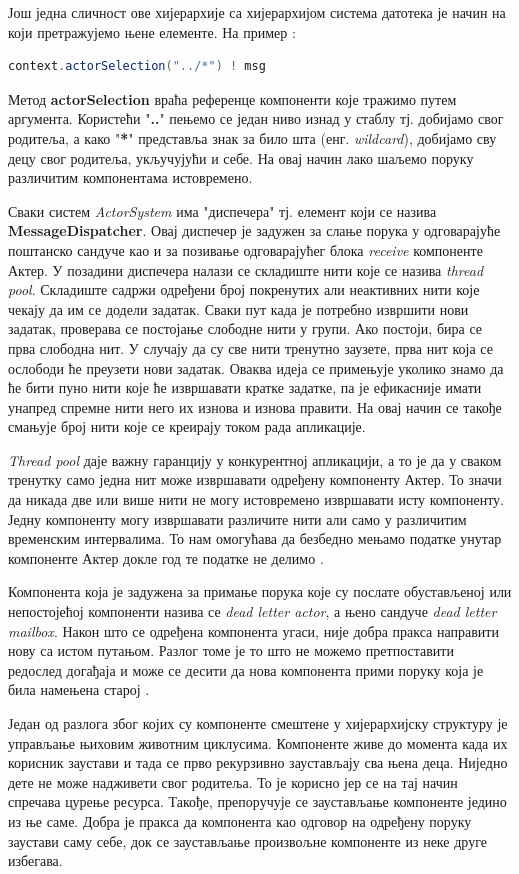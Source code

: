 \documentclass[12pt,oneside]{memoir}
\begin{document}
Још једна сличност ове хијерархије са хијерархијом система датотека је начин на који претражујемо њене елементе. На пример \cite{akkaDoc}:
\begin{lstlisting}[language=Scala]
context.actorSelection("../*") ! msg
\end{lstlisting}
Метод \textbf{actorSelection} враћа референце компоненти које тражимо путем аргумента. Користећи "\textbf{..}" пењемо се један ниво изнад у стаблу тј. добијамо свог родитеља, а како "\textbf{*}" представља знак за било шта (енг. \textit{wildcard}), добијамо сву децу свог родитеља, укључујући и себе. На овај начин лако шаљемо поруку различитим компонентама истовремено.
\par Сваки систем \textit{ActorSystem} има "диспечера" тј. елемент који се назива \textbf{MessageDispatcher}. Овај диспечер је задужен за слање порука у одговарајуће поштанско сандуче као и за позивање одговарајућег блока \textit{receive} компоненте Актер. У позадини диспечера налази се складиште нити које се назива \textit{thread pool}. Складиште садржи одређени број покренутих али неактивних нити које чекају да им се додели задатак. Сваки пут када је потребно извршити нови задатак, проверава се постојање слободне нити у групи. Ако постоји, бира се прва слободна нит. У случају да су све нити тренутно заузете, прва нит која се ослободи ће преузети нови задатак. Оваква идеја се примењује уколико знамо да ће бити пуно нити које ће извршавати кратке задатке, па је ефикасније имати унапред спремне нити него их изнова и изнова правити. На овај начин се такође смањује број нити које се креирају током рада апликације.

\textit{Thread pool} даје важну гаранцију у конкурентној апликацији, а то је да у сваком тренутку само једна нит може извршавати одређену компоненту Актер. То значи да никада две или више нити не могу истовремено извршавати исту компоненту. Једну компоненту могу извршавати различите нити али само у различитим временским интервалима. То нам омогућава да безбедно мењамо податке унутар компоненте Актер докле год те податке не делимо \cite{progInScala3, akkaDoc}. 
\par Компонента која је задужена за примање порука које су послате обустављеној или непостојећој компоненти назива се \textit{dead letter actor}, а њено сандуче \textit{dead letter mailbox}. Након што се одређена компонента угаси, није добра пракса направити нову са истом путањом. Разлог томе је то што не можемо претпоставити редослед догађаја и може се десити да нова компонента прими поруку која је била намењена старој \cite{akkaDoc}.
\par Један од разлога због којих су компоненте смештене у хијерархијску структуру је управљање њиховим животним циклусима. Компоненте живе до момента када их корисник заустави и тада се прво рекурзивно заустављају сва њена деца. Ниједно дете не може надживети свог родитеља. То је корисно јер се на тај начин спречава цурење ресурса. Такође, препоручује се заустављање компоненте једино из ње саме. Добра је пракса да компонента као одговор на одређену поруку заустави саму себе, док се заустављање произвољне компоненте из неке друге избегава.
\end{document}

